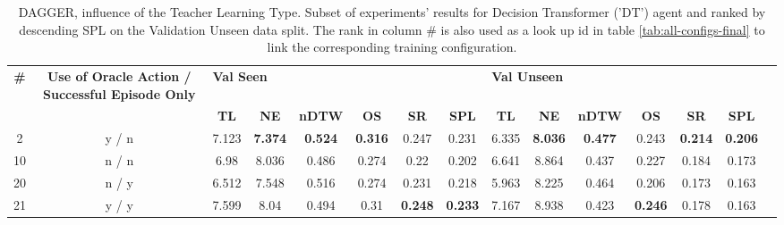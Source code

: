 \begin{table}
\centering
\caption{\label{tab:dt_dagger_pe_oa}DAGGER, influence of the Teacher Learning Type. Subset of experiments' results for Decision Transformer ('DT') agent and ranked by descending SPL on the Validation Unseen data split. The rank in column \# is also used as a look up id in table \ref{tab:all-configs-final} to link the corresponding training configuration.}
\begin{tabular}{@{\hskip3pt}c@{\hskip3pt}c@{\hskip3pt}c@{\hskip3pt}c@{\hskip3pt}c@{\hskip3pt}c@{\hskip3pt}c@{\hskip3pt}c@{\hskip3pt}c@{\hskip3pt}c@{\hskip3pt}c@{\hskip3pt}c@{\hskip3pt}c@{\hskip3pt}c@{\hskip3pt}c}
\toprule
\textbf{\#} & \textbf{ Use of Oracle Action / Successful Episode Only} & \multicolumn{6}{l}{\textbf{Val Seen}} & \multicolumn{6}{l}{\textbf{Val Unseen}} \\
 \textbf{~} &                                               \textbf{~} &       \textbf{TL} &     \textbf{NE} &   \textbf{nDTW} &     \textbf{OS} &     \textbf{SR} &    \textbf{SPL} &         \textbf{TL} &     \textbf{NE} &   \textbf{nDTW} &     \textbf{OS} &     \textbf{SR} &    \textbf{SPL} \\
\midrule
          2 &                                              y / n &             7.123 &  \textbf{7.374} &  \textbf{0.524} &  \textbf{0.316} &           0.247 &           0.231 &               6.335 &  \textbf{8.036} &  \textbf{0.477} &           0.243 &  \textbf{0.214} &  \textbf{0.206} \\
         10 &                                              n / n &              6.98 &           8.036 &           0.486 &           0.274 &            0.22 &           0.202 &               6.641 &           8.864 &           0.437 &           0.227 &           0.184 &           0.173 \\
         20 &                                              n / y &             6.512 &           7.548 &           0.516 &           0.274 &           0.231 &           0.218 &               5.963 &           8.225 &           0.464 &           0.206 &           0.173 &           0.163 \\
         21 &                                              y / y &             7.599 &            8.04 &           0.494 &            0.31 &  \textbf{0.248} &  \textbf{0.233} &               7.167 &           8.938 &           0.423 &  \textbf{0.246} &           0.178 &           0.163 \\
\bottomrule
\end{tabular}
\end{table}
